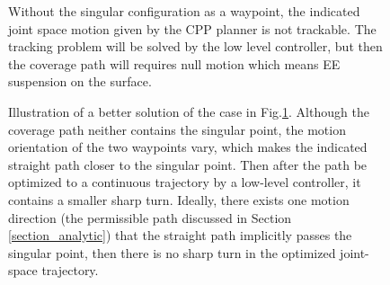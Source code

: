 \documentclass[Afour,sageh,times]{sagej}
\begin{document}
\begin{figure}[t]
\centering
{}
\caption{Without the singular configuration as a waypoint, the indicated joint space motion given by the CPP planner is not trackable. The tracking problem will be solved by the low level controller, but then the coverage path will requires null motion which means EE suspension on the surface. 
}\label{fig:indicated}
\end{figure}

\begin{figure}[t]
\centering
{}
\caption{Illustration of a better solution of the case in Fig.\ref{fig:indicated}. Although the coverage path neither contains the singular point, the motion orientation of the two waypoints vary, which makes the indicated straight path closer to the singular point. Then after the path be optimized to a continuous trajectory by a low-level controller, it contains a smaller sharp turn. Ideally, there exists one motion direction (the permissible path discussed in Section \ref{section_analytic}) that the straight path implicitly passes the singular point, then there is no sharp turn in the optimized joint-space trajectory. 
}\label{fig:better}
\end{figure}
\end{document}
